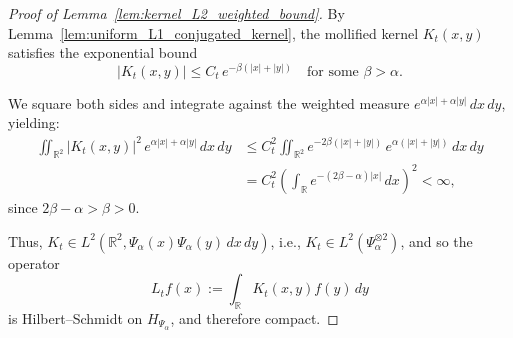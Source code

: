 \begin{proof}[Proof of Lemma~\ref{lem:kernel_L2_weighted_bound}]
By Lemma~\ref{lem:uniform_L1_conjugated_kernel}, the mollified kernel \( K_t(x,y) \) satisfies the exponential bound
\[
|K_t(x,y)| \leq C_t \, e^{-\beta(|x| + |y|)} \quad \text{for some } \beta > \alpha.
\]

We square both sides and integrate against the weighted measure \( e^{\alpha|x| + \alpha|y|}\, dx\, dy \), yielding:
\[
\begin{aligned}
\iint_{\mathbb{R}^2} |K_t(x,y)|^2\, e^{\alpha|x| + \alpha|y|}\, dx\, dy
&\le C_t^2 \iint_{\mathbb{R}^2} e^{-2\beta(|x| + |y|)}\, e^{\alpha(|x| + |y|)}\, dx\, dy \\
&= C_t^2 \left( \int_{\mathbb{R}} e^{-(2\beta - \alpha)|x|}\, dx \right)^2 < \infty,
\end{aligned}
\]
since \( 2\beta - \alpha > \beta > 0 \).

\medskip
\noindent Thus, \( K_t \in L^2(\mathbb{R}^2, \Psi_\alpha(x)\Psi_\alpha(y)\, dx\, dy) \), i.e., \( K_t \in L^2(\Psi_\alpha^{\otimes 2}) \), and so the operator
\[
L_t f(x) := \int_{\mathbb{R}} K_t(x,y) f(y)\, dy
\]
is Hilbert–Schmidt on \( H_{\Psi_\alpha} \), and therefore compact.
\end{proof}
